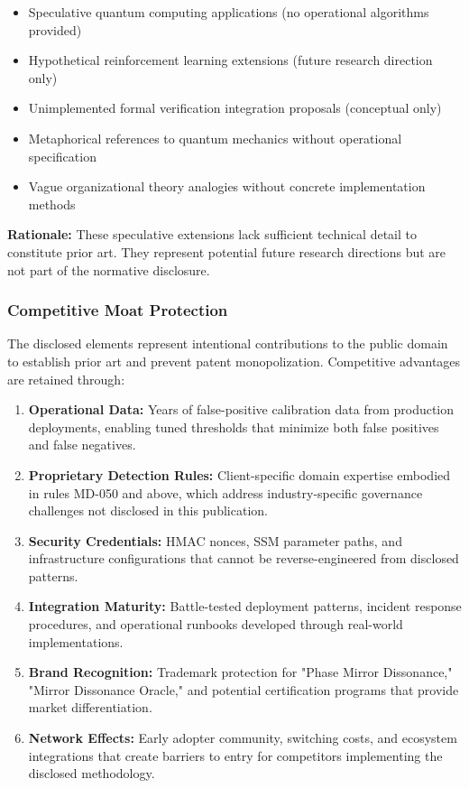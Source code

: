 \documentclass[11pt,a4paper]{article}
\begin{document}
\begin{itemize}
\item Speculative quantum computing applications (no operational algorithms provided)
\item Hypothetical reinforcement learning extensions (future research direction only)
\item Unimplemented formal verification integration proposals (conceptual only)
\item Metaphorical references to quantum mechanics without operational specification
\item Vague organizational theory analogies without concrete implementation methods
\end{itemize}

\textbf{Rationale:} These speculative extensions lack sufficient technical detail to constitute prior art. They represent potential future research directions but are not part of the normative disclosure.

\subsubsection{Competitive Moat Protection}

The disclosed elements represent intentional contributions to the public domain to establish prior art and prevent patent monopolization. Competitive advantages are retained through:

\begin{enumerate}
\item \textbf{Operational Data:} Years of false-positive calibration data from production deployments, enabling tuned thresholds that minimize both false positives and false negatives.

\item \textbf{Proprietary Detection Rules:} Client-specific domain expertise embodied in rules MD-050 and above, which address industry-specific governance challenges not disclosed in this publication.

\item \textbf{Security Credentials:} HMAC nonces, SSM parameter paths, and infrastructure configurations that cannot be reverse-engineered from disclosed patterns.

\item \textbf{Integration Maturity:} Battle-tested deployment patterns, incident response procedures, and operational runbooks developed through real-world implementations.

\item \textbf{Brand Recognition:} Trademark protection for "Phase Mirror Dissonance," "Mirror Dissonance Oracle," and potential certification programs that provide market differentiation.

\item \textbf{Network Effects:} Early adopter community, switching costs, and ecosystem integrations that create barriers to entry for competitors implementing the disclosed methodology.
\end{enumerate}
\end{document}
